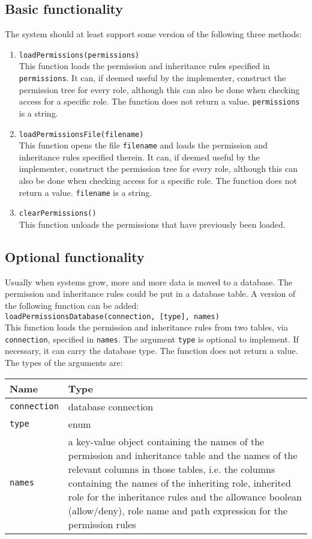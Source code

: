\documentclass{article}
\begin{document}
	\subsection{Basic functionality}
	The system should at least support some version of the following three methods:
	\begin{enumerate}[1.]
		\item
			\texttt{loadPermissions(permissions)}\\
			This function loads the permission and inheritance rules specified in \texttt{permissions}. It can, if deemed useful by the implementer, construct the permission tree for every role, although this can also be done when checking access for a specific role. The function does not return a value. \texttt{permissions} is a string.
		\item \texttt{loadPermissionsFile(filename)}\\
			This function opens the file \texttt{filename} and loads the permission and inheritance rules specified therein. It can, if deemed useful by the implementer, construct the permission tree for every role, although this can also be done when checking access for a specific role. The function does not return a value. \texttt{filename} is a string.
		\item \texttt{clearPermissions()}\\
			This function unloads the permissions that have previously been loaded.
	\end{enumerate}

	\subsection{Optional functionality}
	Usually when systems grow, more and more data is moved to a database. The permission and inheritance rules could be put in a database table. A version of the following function can be added:\\
	\texttt{loadPermissionsDatabase(connection, [type], names)}\\
	This function loads the permission and inheritance rules from two tables, via \texttt{connection}, specified in \texttt{names}. The argument \texttt{type} is optional to implement. If necessary, it can carry the database type. The function does not return a value. The types of the arguments are:\\
	\begin{tabular}{l|p{}}
		\textbf{Name} & \textbf{Type}\\\hline
		\texttt{connection} & database connection\\\hline
		\texttt{type} & enum\\\hline
		\texttt{names} & a key-value object containing the names of the permission and inheritance table and the names of the relevant columns in those tables, i.e. the columns containing the names of the inheriting role, inherited role for the inheritance rules and the allowance boolean (allow/deny), role name and path expression for the permission rules
	\end{tabular}
\end{document}
